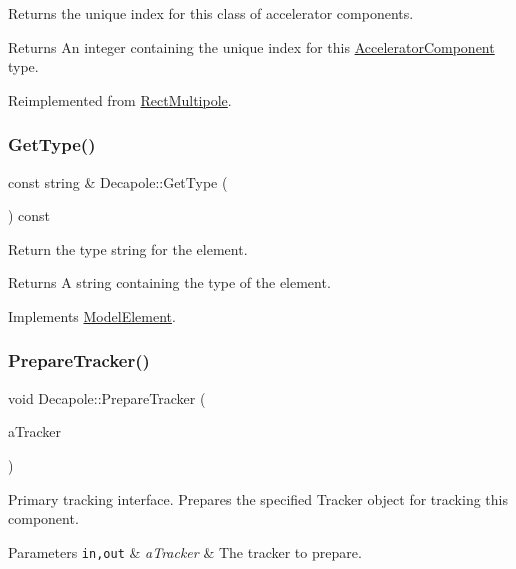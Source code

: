 Returns the unique index for this class of accelerator components. \begin{DoxyReturn}{Returns}
An integer containing the unique index for this \hyperlink{classAcceleratorComponent}{Accelerator\+Component} type. 
\end{DoxyReturn}


Reimplemented from \hyperlink{classRectMultipole_a9bc789b2a193e341aab8bbd47a0e3ad4}{Rect\+Multipole}.

\mbox{\label{classDecapole_af39bab6b0dd2177c83cc8dd548401103}} 
\subsubsection{\texorpdfstring{Get\+Type()}{GetType()}}
{\footnotesize\ttfamily const string \& Decapole\+::\+Get\+Type (\begin{DoxyParamCaption}{ }\end{DoxyParamCaption}) const\hspace{0.3cm}{\ttfamily [virtual]}}

Return the type string for the element. \begin{DoxyReturn}{Returns}
A string containing the type of the element. 
\end{DoxyReturn}


Implements \hyperlink{classModelElement_a04dc2e51e1999fca612eb1838ec6b271}{Model\+Element}.

\mbox{\label{classDecapole_a7fd7331bfbc39982539f8077afef2e6e}} 
\subsubsection{\texorpdfstring{Prepare\+Tracker()}{PrepareTracker()}}
{\footnotesize\ttfamily void Decapole\+::\+Prepare\+Tracker (\begin{DoxyParamCaption}\item[{\hyperlink{classComponentTracker}{Component\+Tracker} \&}]{a\+Tracker }\end{DoxyParamCaption})\hspace{0.3cm}{\ttfamily [virtual]}}

Primary tracking interface. Prepares the specified Tracker object for tracking this component. 
\begin{DoxyParams}[1]{Parameters}
\mbox{\tt in,out}  & {\em a\+Tracker} & The tracker to prepare. \\
\hline
\end{DoxyParams}


